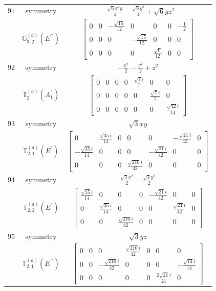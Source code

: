 \documentclass[fleqn,8pt,landscape]{jsarticle}
\begin{document}
\begin{longtable}{ccc}
$ 91 $ & $ \text{symmetry} $ & $ - \frac{\sqrt{6} x^{2} y}{4} - \frac{\sqrt{6} y^{3}}{4} + \sqrt{6} y z^{2} $ \\
$  $ & $ \mathbb{G}_{3,2}^{(a)}(E^{\prime\prime}) $ & $ \begin{bmatrix} 0 & 0 & - \frac{\sqrt{15}}{12} & 0 & 0 & 0 & - \frac{1}{2} \\ 0 & 0 & 0 & - \frac{\sqrt{15}}{12} & 0 & 0 & 0 \\ 0 & 0 & 0 & 0 & \frac{\sqrt{6}}{12} & 0 & 0 \end{bmatrix} $ \\ \hline
$ 92 $ & $ \text{symmetry} $ & $ - \frac{x^{2}}{2} - \frac{y^{2}}{2} + z^{2} $ \\
$  $ & $ \mathbb{T}_{2}^{(a)}(A_{1}^{\prime}) $ & $ \begin{bmatrix} 0 & 0 & 0 & 0 & \frac{\sqrt{7} i}{7} & 0 & 0 \\ 0 & 0 & 0 & 0 & 0 & \frac{\sqrt{7} i}{7} & 0 \\ 0 & 0 & 0 & 0 & 0 & 0 & \frac{\sqrt{42} i}{14} \end{bmatrix} $ \\ \hline
$ 93 $ & $ \text{symmetry} $ & $ \sqrt{3} x y $ \\
$  $ & $ \mathbb{T}_{2,1}^{(a)}(E^{\prime}) $ & $ \begin{bmatrix} 0 & \frac{\sqrt{35} i}{14} & 0 & 0 & 0 & - \frac{\sqrt{21} i}{42} & 0 \\ - \frac{\sqrt{35} i}{14} & 0 & 0 & 0 & - \frac{\sqrt{21} i}{42} & 0 & 0 \\ 0 & 0 & 0 & \frac{\sqrt{210} i}{42} & 0 & 0 & 0 \end{bmatrix} $ \\ \hline
$ 94 $ & $ \text{symmetry} $ & $ \frac{\sqrt{3} x^{2}}{2} - \frac{\sqrt{3} y^{2}}{2} $ \\
$  $ & $ \mathbb{T}_{2,2}^{(a)}(E^{\prime}) $ & $ \begin{bmatrix} \frac{\sqrt{35} i}{14} & 0 & 0 & 0 & - \frac{\sqrt{21} i}{42} & 0 & 0 \\ 0 & \frac{\sqrt{35} i}{14} & 0 & 0 & 0 & \frac{\sqrt{21} i}{42} & 0 \\ 0 & 0 & \frac{\sqrt{210} i}{42} & 0 & 0 & 0 & 0 \end{bmatrix} $ \\ \hline
$ 95 $ & $ \text{symmetry} $ & $ \sqrt{3} y z $ \\
$  $ & $ \mathbb{T}_{2,1}^{(a)}(E^{\prime\prime}) $ & $ \begin{bmatrix} 0 & 0 & 0 & \frac{\sqrt{210} i}{42} & 0 & 0 & 0 \\ 0 & 0 & - \frac{\sqrt{210} i}{42} & 0 & 0 & 0 & - \frac{\sqrt{14} i}{14} \\ 0 & 0 & 0 & 0 & 0 & \frac{2 \sqrt{21} i}{21} & 0 \end{bmatrix} $ \\ \hline

\end{longtable}
\end{document}
